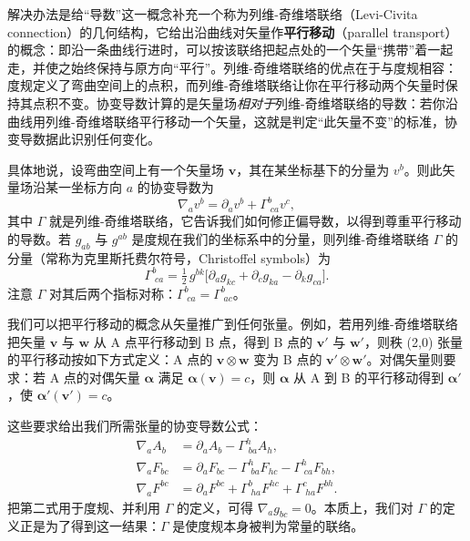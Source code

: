 解决办法是给“导数”这一概念补充一个称为列维-奇维塔联络（Levi-Civita connection）的几何结构，它给出沿曲线对矢量作\textbf{平行移动}（parallel transport）的概念：即沿一条曲线行进时，可以按该联络把起点处的一个矢量“携带”着一起走，并使之始终保持与原方向“平行”。列维-奇维塔联络的优点在于与度规相容：度规定义了弯曲空间上的点积，而列维-奇维塔联络让你在平行移动两个矢量时保持其点积不变。协变导数计算的是矢量场\emph{相对于}列维-奇维塔联络的导数：若你沿曲线用列维-奇维塔联络平行移动一个矢量，这就是判定“此矢量不变”的标准，协变导数据此识别任何变化。

具体地说，设弯曲空间上有一个矢量场 $\mathbf{v}$，其在某坐标基下的分量为 $v^{b}$。则此矢量场沿某一坐标方向 $a$ 的协变导数为
\begin{equation}
\nabla_{a} v^{b} = \partial_{a} v^{b} + \Gamma^{b}_{\;ca} v^{c},
\end{equation}
其中 $\Gamma$ 就是列维-奇维塔联络，它告诉我们如何修正偏导数，以得到尊重平行移动的导数。若 $g_{ab}$ 与 $g^{ab}$ 是度规在我们的坐标系中的分量，则列维-奇维塔联络 $\Gamma$ 的分量（常称为克里斯托费尔符号，Christoffel symbols）为
\begin{equation}
\Gamma^{b}_{\;ca} = \tfrac12\,g^{bk}\bigl[\partial_{a}g_{kc}+\partial_{c}g_{ka}-\partial_{k}g_{ca}\bigr].
\end{equation}
注意 $\Gamma$ 对其后两个指标对称：$\Gamma^{b}_{\;ca}=\Gamma^{b}_{\;ac}$。

我们可以把平行移动的概念从矢量推广到任何张量。例如，若用列维-奇维塔联络把矢量 $\mathbf{v}$ 与 $\mathbf{w}$ 从 A 点平行移动到 B 点，得到 B 点的 $\mathbf{v}'$ 与 $\mathbf{w}'$，则秩 (2,0) 张量的平行移动按如下方式定义：A 点的 $\mathbf{v}\otimes\mathbf{w}$ 变为 B 点的 $\mathbf{v}'\otimes\mathbf{w}'$。对偶矢量则要求：若 A 点的对偶矢量 $\bm{\alpha}$ 满足 $\bm{\alpha}(\mathbf{v})=c$，则 $\bm{\alpha}$ 从 A 到 B 的平行移动得到 $\bm{\alpha}'$，使 $\bm{\alpha}'(\mathbf{v}')=c$。

这些要求给出我们所需张量的协变导数公式：
\begin{align}
\nabla_{a} A_{b} &= \partial_{a} A_{b} - \Gamma^{h}_{\;ba} A_{h},\\
\nabla_{a} F_{bc} &= \partial_{a} F_{bc} - \Gamma^{h}_{\;ba} F_{hc} - \Gamma^{h}_{\;ca} F_{bh},\\
\nabla_{a} F^{bc} &= \partial_{a} F^{bc} + \Gamma^{b}_{\;ha} F^{hc} + \Gamma^{c}_{\;ha} F^{bh}.
\end{align}
把第二式用于度规、并利用 $\Gamma$ 的定义，可得 $\nabla_{a} g_{bc}=0$。本质上，我们对 $\Gamma$ 的定义正是为了得到这一结果：$\Gamma$ 是使度规本身被判为常量的联络。

